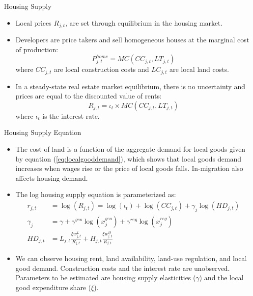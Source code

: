 \documentclass[aspectratio=169]{beamer}
\begin{document}
\begin{frame}{Housing Supply}

\begin{itemize}
    \item<1-> Local prices $ R_{j,t} $, are set through equilibrium in the housing market.
    \item<2-> Developers are price takers and sell homogeneous houses at the marginal cost of production:
    \begin{equation*}
        P_{j,t}^{home} = MC\left( CC_{j,t}, LT_{j,t} \right)
    \end{equation*}
    where $ CC_{j,t} $ are local construction costs and $ LC_{j,t} $ are local land costs.
    \item<3-> In a steady-state real estate market equilibrium, there is no uncertainty and prices are equal to the discounted value of rents:
    \begin{equation*}
        R_{j,t} = \iota_{t} \times MC\left( CC_{j,t}, LT_{j,t} \right)
    \end{equation*}
    where $ \iota_{t} $ is the interest rate.
\end{itemize}
    
\end{frame}


\begin{frame}{Housing Supply Equation}

\begin{itemize}
    \item<1->  The cost of land is a function of the aggregate demand for local goods given by equation (\ref{eq:localgooddemand}), which shows that local goods demand increases when wages rise or the price of local goods falls.  In-migration also affects housing demand.
    \item<2-> The log housing supply equation is parameterized as:
    \begin{equation*}
        \begin{split}
            r_{j,t} &= \log \left( R_{j,t} \right) = \log \left( \iota_{t} \right) + \log \left( CC_{j,t} \right) + \gamma_{j} \log \left( HD_{j,t} \right) \\
            \gamma_{j} &= \gamma + \gamma^{geo} \log\left( x_{j}^{geo} \right) + \gamma^{reg} \log\left( x_{j}^{reg} \right) \\
            HD_{j,t} &= L_{j,t} \frac{\xi w_{j,t}^{L}}{R_{j,t}} + H_{j,t} \frac{\xi w_{j,t}^{H}}{R_{j,t}}
        \end{split}
    \end{equation*}
    \item<3-> We can observe housing rent, land availability, land-use regulation, and local good demand.  Construction costs and the interest rate are unobserved.  Parameters to be estimated are housing supply elasticities ($ \gamma $) and the local good expenditure share ($ \xi $).
\end{itemize}
    
\end{frame}
\end{document}
